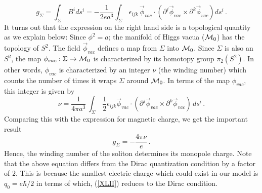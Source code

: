 \begin{equation}
g_\Sigma=\int_\Sigma\,B^i ds^i=-\frac{1}{2 ea^3} \int_\Sigma\, 
\epsilon_{ijk}\,\vec{\phi}_{vac}\cdot \left(\partial^j\vec{\phi}_{vac}
\times\partial^k\vec{\phi}_{vac}\right)ds^i\,.
\label{XL}
\end{equation}
It turns out that the expression on the right hand side is a
topological quantity as we explain below: Since $\phi^2=a$; the
manifold of Higgs vacua (${\cal M}_0$) has the topology of $S^2$. 
The field $\vec{\phi}_{vac}$ defines a map from $\Sigma$ into 
${\cal M}_0$. Since $\Sigma$ is also an $S^2$, the map 
$\phi_{vac}:\Sigma\rightarrow{\cal M}_0$ is characterized by its
homotopy group $\pi_2 (S^2)$. In other words, $\phi_{vac}$ is
characterized by an integer $\nu$ (the winding number) which counts the
number of times it wraps $\Sigma$ around ${\cal M}_0$. In terms of
the map $\phi_{vac}$, this integer is given by
\begin{equation}
\nu = \frac{1}{4\pi a^{3}} \, \int_\Sigma\,\frac{1}{2}
\epsilon_{ijk}\vec{\phi}_{vac}\cdot\left(\partial^j\vec{\phi}_{vac}
\times \partial^k\vec{\phi}_{vac}\right)\,d s^i\,.
\label{XLI}
\end{equation}
Comparing this with the expression for magnetic charge, we get the
important result
\begin{equation}
g_{\Sigma} = - \frac{4\pi \nu}{e}\,.
\label{XLII}
\end{equation}
Hence, the winding number of the soliton determines its monopole
charge. Note that the above equation differs from the Dirac
quantization condition by a factor of $2$. This is because the
smallest electric charge which could exist in our model is 
$q_0=e\hbar/2$ in terms of which, (\ref{XLII}) reduces to the Dirac
condition. 

